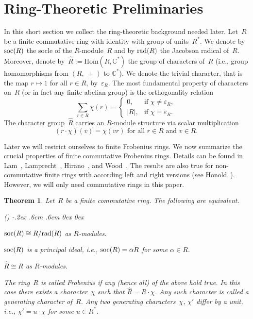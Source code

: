 \documentclass[11pt]{article}
\newtheorem{theo}{Theorem}[section]
\theoremstyle{definition}
\numberwithin{equation}{section}
\newcommand{\C}{{\mathbb C}}
\newcommand{\veps}{{\varepsilon}}
\newcommand{\soc}{\mbox{\rm soc}}
\newcommand{\rad}{\mbox{\rm rad}}
\newcommand{\Rhat}{\mbox{$\widehat{R}$}}
\newcounter{alp}
\newcounter{ara}
\newcounter{rom}
\newenvironment{alphalist}{\begin{list}{(\alph{alp})\hfill}{\usecounter{alp}
     \topsep-.2ex \labelwidth.6cm \leftmargin.6cm \labelsep0cm
     \rightmargin0cm \parsep0ex \itemsep0ex}}{\end{list}}
\begin{document}
\section{Ring-Theoretic Preliminaries}
In this short section we collect the ring-theoretic background needed later.
Let~$R$ be a finite commutative ring with identity with group of units~$R^*$.
We denote by~$\soc(R)$ the socle of the $R$-module~$R$ and by
$\rad(R)$ the Jacobson radical of~$R$.
Moreover, denote by~$\Rhat:=\text{Hom}(R,\C^*)$ the group of characters of~$R$
(i.e., group homomorphisms from $(R,\,+\,)$ to $\C^*$).
We denote the trivial character, that is the map $r\mapsto 1$ for all $r\in R$, by~$\veps_R$.
The most fundamental property of characters on~$R$ (or in fact any finite abelian group) is the orthogonality relation
\begin{equation}\label{e-RChar}
   \sum_{r\in R}\chi(r)=\left\{\begin{array}{cl}
          0,&\text{if }\chi\neq\veps_R,\\ |R|,&\text{if }\chi=\veps_R.\end{array}\right.
\end{equation}
The character group~$\Rhat$ carries an $R$-module structure via scalar multiplication
\begin{equation}\label{e-bimodule}
    (r\!\cdot\!\chi)(v)=\chi(vr) \text{ for all } r\in R\text{ and }v\in R.
\end{equation}

Later we will restrict ourselves to finite Frobenius rings.
We now summarize the crucial properties of finite commutative Frobenius rings.
Details can be found in Lam~\cite[Th.~(16.14)]{Lam99}, Lamprecht~\cite{Lamp53}, Hirano~\cite[Th.~1]{Hi97}, and
Wood~\cite[Th.~3.10, Prop.~5.1]{Wo99}.
The results are also true for non-commutative finite rings with according left and right versions (see Honold~\cite[Th.~1 and Th.~2]{Hon01}).
However, we will only need commutative rings in this paper.

\begin{theo}\label{T-Frob}
Let~$R$ be a finite commutative ring. The following are equivalent.
\begin{alphalist}
\item $\soc(R)\cong R/\rad(R)$ as $R$-modules.
\item $\soc(R)$ is a principal ideal, i.e., $\soc(R)=\alpha R$ for some $\alpha\in R$.
\item $\Rhat\cong R$ as $R$-modules.
\end{alphalist}
The ring~$R$ is called Frobenius if any (hence all) of the above hold true.
In this case there exists a character~$\chi$ such that $\Rhat= R\!\cdot\!\chi$.
Any such character is called a generating character of~$R$.
Any two generating characters~$\chi,\,\chi'$ differ by a unit, i.e., $\chi'=u\!\cdot\!\chi$ for some $u\in R^*$.
\end{theo}
\end{document}
